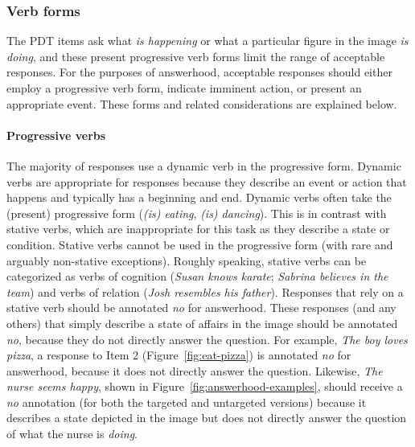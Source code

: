 \documentclass[12pt]{article}
\begin{document}

\subsubsection{Verb forms}
\label{subsubsection:answerhood-verbs}
The PDT items ask what \textit{is happening} or what a particular figure in the image \textit{is doing}, and these present progressive verb forms limit the range of acceptable responses. For the purposes of answerhood, acceptable responses should either employ a progressive verb form,  indicate imminent action, or present an appropriate event. These forms and related considerations are explained below.

\paragraph{Progressive verbs} The majority of responses use a dynamic verb in the progressive form. Dynamic verbs are appropriate for responses because they describe an event or action that happens and typically has a beginning and end. Dynamic verbs often take the (present) progressive form (\textit{(is) eating}, \textit{(is) dancing}). This is in contrast with stative verbs, which are inappropriate for this task as they describe a state or condition. Stative verbs cannot be used in the progressive form (with rare and arguably non-stative exceptions). Roughly speaking, stative verbs can be categorized as verbs of cognition (\textit{Susan knows karate}; \textit{Sabrina believes in the team}) and verbs of relation (\textit{Josh resembles his father}). Responses that rely on a stative verb should be annotated \textit{no} for answerhood. These responses (and any others) that simply describe a state of affairs in the image should be annotated \textit{no}, because they do not directly answer the question. For example, \textit{The boy loves pizza}, a response to Item 2 (Figure~\ref{fig:eat-pizza}) is annotated \textit{no} for answerhood, because it does not directly answer the question. Likewise, \textit{The nurse seems happy}, shown in Figure~\ref{fig:answerhood-examples}, should receive a \textit{no} annotation (for both the targeted and untargeted versions) because it describes a state depicted in the image but does not directly answer the question of what the nurse is \textit{doing}.
\end{document}
